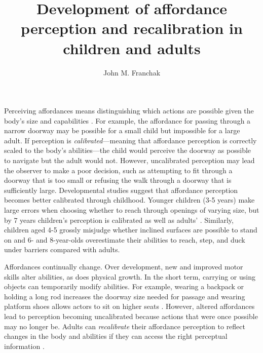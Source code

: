 \documentclass[a4paper,man,natbib,floatsintext,noextraspace]{apa6}
\title{Development of affordance perception and recalibration in children and adults}
\author{John M. Franchak}
\affiliation{University of California, Riverside}
\begin{document}
\maketitle

Perceiving affordances means distinguishing which actions are possible given the body's size and capabilities \citep{Gibson79}. For example, the affordance for passing through a narrow doorway may be possible for a small child but impossible for a large adult. If perception is \textit{calibrated}---meaning that affordance perception is correctly scaled to the body's abilities---the child would perceive the doorway as possible to navigate but the adult would not. However, uncalibrated perception may lead the observer to make a poor decision, such as attempting to fit through a doorway that is too small or refusing the walk through a doorway that is sufficiently large. Developmental studies suggest that affordance perception becomes better calibrated through childhood. Younger children (3-5 years) make large errors when choosing whether to reach through openings of varying size, but by 7 years children’s perception is calibrated as well as adults' \citep{ChildReaching}. Similarly, children aged 4-5 grossly misjudge whether inclined surfaces are possible to stand on \citep{KlevbergAnderson} and 6- and 8-year-olds overestimate their abilities to reach, step, and duck under barriers \citep{Plumert95} compared with adults.

Affordances continually change. Over development, new and improved motor skills alter abilities, as does physical growth. In the short term, carrying or using objects can temporarily modify abilities. For example, wearing a backpack or holding a long rod increases the doorway size needed for passage \citep{Recal,DoorwayLearning,Yasuda} and wearing platform shoes allows actors to sit on higher seats \citep{Mark87}. However, altered affordances lead to perception becoming uncalibrated because actions that were once possible may no longer be. Adults can \textit{recalibrate} their affordance perception to reflect changes in the body and abilities if they can access the right perceptual information \citep{Recal,DoorwayLearning,Mark87,MarkSitting90}. 
\end{document}

